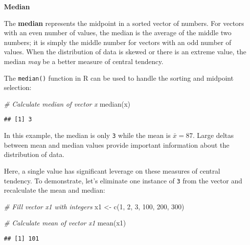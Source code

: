 \documentclass[
]{book}
\newenvironment{Shaded}{\begin{snugshade}}{\end{snugshade}}
\newcommand{\CommentTok}[1]{\textcolor[rgb]{0.56,0.35,0.01}{\textit{#1}}}
\newcommand{\DecValTok}[1]{\textcolor[rgb]{0.00,0.00,0.81}{#1}}
\newcommand{\FunctionTok}[1]{\textcolor[rgb]{0.00,0.00,0.00}{#1}}
\newcommand{\NormalTok}[1]{#1}
\newcommand{\OtherTok}[1]{\textcolor[rgb]{0.56,0.35,0.01}{#1}}
\begin{document}
\textbf{Median}

The \textbf{median} represents the midpoint in a sorted vector of numbers. For vectors with an even number of values, the median is the average of the middle two numbers; it is simply the middle number for vectors with an odd number of values. When the distribution of data is skewed or there is an extreme value, the median \emph{may} be a better measure of central tendency.

The \texttt{median()} function in R can be used to handle the sorting and midpoint selection:

\begin{Shaded}
\begin{Highlighting}[]
\CommentTok{\# Calculate median of vector x}
\FunctionTok{median}\NormalTok{(x)}
\end{Highlighting}
\end{Shaded}

\begin{verbatim}
## [1] 3
\end{verbatim}

In this example, the median is only \texttt{3} while the mean is \(\bar{x} = 87\). Large deltas between mean and median values provide important information about the distribution of data.

Here, a single value has significant leverage on these measures of central tendency. To demonstrate, let's eliminate one instance of \texttt{3} from the vector and recalculate the mean and median:

\begin{Shaded}
\begin{Highlighting}[]
\CommentTok{\# Fill vector x1 with integers}
\NormalTok{x1 }\OtherTok{\textless{}{-}} \FunctionTok{c}\NormalTok{(}\DecValTok{1}\NormalTok{, }\DecValTok{2}\NormalTok{, }\DecValTok{3}\NormalTok{, }\DecValTok{100}\NormalTok{, }\DecValTok{200}\NormalTok{, }\DecValTok{300}\NormalTok{)}
\end{Highlighting}
\end{Shaded}

\begin{Shaded}
\begin{Highlighting}[]
\CommentTok{\# Calculate mean of vector x1}
\FunctionTok{mean}\NormalTok{(x1)}
\end{Highlighting}
\end{Shaded}

\begin{verbatim}
## [1] 101
\end{verbatim}
\end{document}
